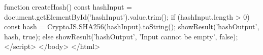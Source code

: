         function createHash() {
            const hashInput = document.getElementById('hashInput').value.trim();
            if (hashInput.length > 0) {
                const hash = CryptoJS.SHA256(hashInput).toString();
                showResult('hashOutput', hash, true);
            } else {
                showResult('hashOutput', 'Input cannot be empty', false);
            }
        }
    </script>
</body>
</html>

